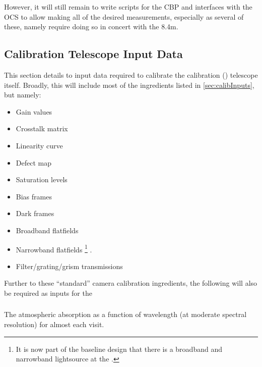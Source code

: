 However, it will still remain to write scripts for the CBP and interfaces with the OCS to allow making all of the desired measurements, especially as several of these, namely \rednote{\xxx, \xxx \& \xxx} require doing so in concert with the 8.4m.




















\subsection{Calibration Telescope Input Data}
\label{sec:calibrationTelescopeDatasets}
This section details to input data required to calibrate the calibration (\auxtelescope) telescope itself. Broadly, this will include most of the ingredients listed in \secsymbol\ref{sec:calibInputs}, but namely:

\begin{itemize}
	\item Gain values
	\item Crosstalk matrix
	\item Linearity curve
	\item Defect map
	\item Saturation levels
	\item Bias frames
	\item Dark frames
	\item Broadband flatfields
	\item Narrowband flatfields \footnote{It is now part of the baseline design that there is a broadband and narrowband lightsource at the \auxtelescope.}  .
	\item Filter/grating/grism transmissions
\end{itemize}

Further to these ``standard'' camera calibration ingredients, the following will also be required as inputs for the 

\subsubsection{}\label{calypso:atmosphericAbsorption} The atmospheric absorption as a function of wavelength (at moderate spectral resolution) for almost each visit.


